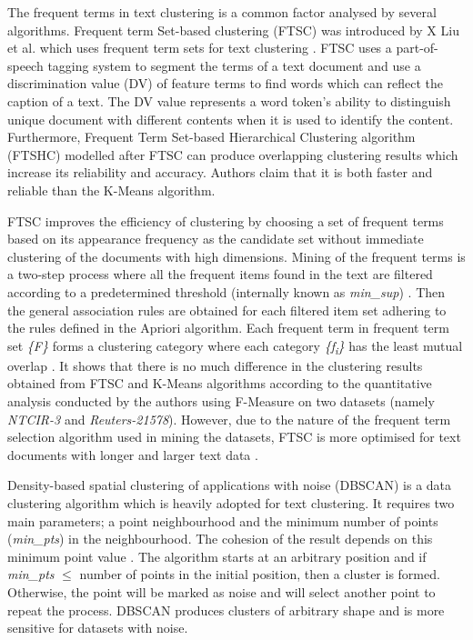 \documentclass[conference]{IEEEtran}
\begin{document}
The frequent terms in text clustering is a common factor analysed by several algorithms. Frequent term Set-based clustering (FTSC) was introduced by X Liu et al. which uses frequent term sets for text clustering \cite{1527337}. FTSC uses a part-of-speech tagging system to segment the terms of a text document and use a discrimination value (DV) of feature terms to find words which can reflect the caption of a text. The DV value represents a word token's ability to distinguish unique document with different contents when it is used to identify the content. Furthermore, Frequent Term Set-based Hierarchical Clustering algorithm (FTSHC) modelled after FTSC can produce overlapping clustering results which increase its reliability and accuracy. Authors claim that it is both faster and reliable than the K-Means algorithm. 

FTSC improves the efficiency of clustering by choosing a set of frequent terms based on its appearance frequency as the candidate set without immediate clustering of the documents with high dimensions. Mining of the frequent terms is a two-step process where all the frequent items found in the text are filtered according to a predetermined threshold (internally known as \textit{min\_sup}) \cite{1527337}. Then the general association rules are obtained for each filtered item set adhering to the rules defined in the Apriori algorithm. Each frequent term in frequent term set \textit{\{F\}} forms a clustering category where each category \textit{\{f\textsubscript{i}\}} has the least mutual overlap \cite{1527337}. It shows that there is no much difference in the clustering results obtained from FTSC and K-Means algorithms according to the quantitative analysis conducted by the authors using F-Measure on two datasets (namely \textit{NTCIR-3} and \textit{Reuters-21578}). However, due to the nature of the frequent term selection algorithm used in mining the datasets, FTSC is more optimised for text documents with longer and larger text data \cite{1527337}.

Density-based spatial clustering of applications with noise (DBSCAN) is a data clustering algorithm which is heavily adopted for text clustering. It requires two main parameters; a point neighbourhood and the minimum number of points (\textit{min\_pts}) in the neighbourhood. The cohesion of the result depends on this minimum point value \cite{5659055}. The algorithm starts at an arbitrary position and if \textit{min\_pts} $\leq$ number of points in the initial position, then a cluster is formed. Otherwise, the point will be marked as noise and will select another point to repeat the process. DBSCAN produces clusters of arbitrary shape and is more sensitive for datasets with noise. 
\end{document}
